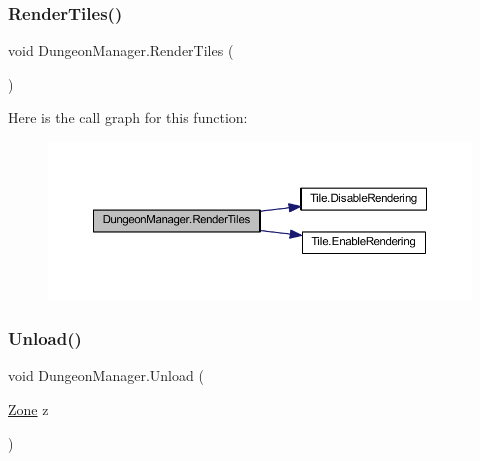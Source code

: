 \mbox{\label{class_dungeon_manager_a89bde2dbae3ffb1dd89635df4a8df153}} 
\subsubsection{\texorpdfstring{RenderTiles()}{RenderTiles()}}
{\footnotesize\ttfamily void Dungeon\+Manager.\+Render\+Tiles (\begin{DoxyParamCaption}{ }\end{DoxyParamCaption})}

Here is the call graph for this function\+:\nopagebreak
\begin{figure}[H]
\begin{center}
\leavevmode
\includegraphics[width=350pt]{class_dungeon_manager_a89bde2dbae3ffb1dd89635df4a8df153_cgraph}
\end{center}
\end{figure}
\mbox{\label{class_dungeon_manager_a010c39db85d745cd24e4e960d248ab4a}} 
\subsubsection{\texorpdfstring{Unload()}{Unload()}}
{\footnotesize\ttfamily void Dungeon\+Manager.\+Unload (\begin{DoxyParamCaption}\item[{\mbox{\hyperlink{class_dungeon_manager_a6558d4a01889674bf25c798f1b90a431}{Zone}}}]{z }\end{DoxyParamCaption})}

\mbox{\label{class_dungeon_manager_a980762c66ae4ae92ce3d8caa42f7fe61}} 
